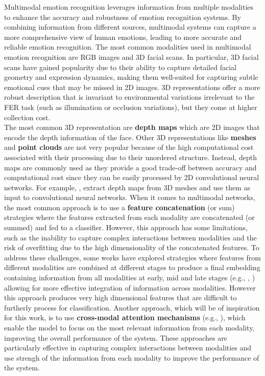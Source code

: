 Multimodal emotion recognition leverages information from multiple modalities to enhance the accuracy and robustness of emotion recognition systems. By combining information from different sources, multimodal systems can capture a more comprehensive view of human emotions, leading to more accurate and reliable emotion recognition. The most common modalities used in multimodal emotion recognition are RGB images and 3D facial scans. In particular, 3D facial scans have gained popularity due to their ability to capture detailed facial geometry and expression dynamics, making them well-suited for capturing subtle emotional cues that may be missed in 2D images. 3D representations offer a more robust description that is invariant to environmental variations irrelevant
to the FER task (such as illumination or occlusion variations), but they come at higher collection cost.\\ The most common 3D representation are \textbf{depth maps} which are 2D images that encode the depth information of the face. Other 3D representations like \textbf{meshes} and \textbf{point clouds} are not very popular because of the high computational cost associated with their processing due to their unordered structure. Instead, depth maps are commonly used as they provide a good trade-off between accuracy and computational cost since they can be easily processed by 2D convolutional neural networks. For example, \cite{RW_8A_AFNET}, \cite{RW_8B_CMANET} extract depth maps from 3D meshes and use them as input to convolutional neural networks.
When it comes to multimodal networks, the most common approach is to use a \textbf{feature concatenation} (or sum) strategies where the features extracted from each modality are concatenated (or summed) and fed to a classifier. However, this approach has some limitations, such as the inability to capture complex interactions between modalities and the risk of overfitting due to the high dimensionality of the concatenated features. To address these challenges, some works have explored strategies  where features from different modalities are combined at different stages to produce a final embedding containing information from all modalities at early, mid and late stages (e.g., \cite{RW_1_POSTERV2}, \cite{RW_11_DDAMFN}) allowing for more effective integration of information across modalities. However this approach produces very high dimensional features that are difficult to furtherly process for classification. Another approach, which will be of inspiration for this work, is to use \textbf{cross-modal attention mechanisms} (e.g., \cite{RW_6_VTFF}), which enable the model to focus on the most relevant information from each modality, improving the overall performance of the system. These approaches are particularly effective in capturing complex interactions between modalities and use strengh of the information from each modality to improve the performance of the system.\\

